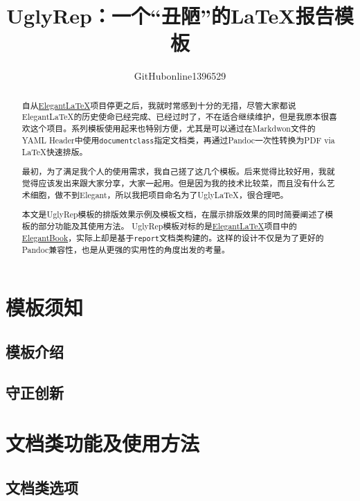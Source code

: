 \documentclass[12pt, green]{uglyrep}
\title{\bfseries UglyRep：一个“丑陋”的\LaTeX{}报告模板}
\author{GitHubonline1396529}
\date{\zhdate{2022/12/31}}
\begin{document}
\maketitle
\begin{abstract}
  自从\href{https://github.com/ElegantLaTeX/}{Elegant\LaTeX}项目停更之后，我就时常感到十分的无措，尽管大家都说 Elegant\LaTeX 的历史使命已经完成、已经过时了，不在适合继续维护，但是我原本很喜欢这个项目。系列模板使用起来也特别方便，尤其是可以通过在Markdwon文件的YAML Header中使用\texttt{documentclass}指定文档类，再通过Pandoc一次性转换为PDF via \LaTeX{}快速排版。

  最初，为了满足我个人的使用需求，我自己搓了这几个模板。后来觉得比较好用，我就觉得应该发出来跟大家分享，大家一起用。但是因为我的技术比较菜，而且没有什么艺术细胞，做不到Elegant，所以我把项目命名为了Ugly\LaTeX{}，很合理吧。

  本文是UglyRep模板的排版效果示例及模板文档，在展示排版效果的同时简要阐述了模板的部分功能及其使用方法。%
  UglyRep模板对标的是\href{https://github.com/ElegantLaTeX/}{Elegant\LaTeX}项目中的\href{https://github.com/ElegantLaTeX/ElegantBook}{ElegantBook}，实际上却是基于\texttt{report}文档类构建的。这样的设计不仅是为了更好的Pandoc兼容性，也是从更强的实用性的角度出发的考量。

\end{abstract}

\tableofcontents

\chapter{模板须知}
\section{模板介绍}


\section{守正创新}


\chapter{文档类功能及使用方法}
\section{文档类选项}\label{ssec:classoptions}
\end{document}
